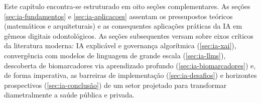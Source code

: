 Este capítulo encontra-se estruturado em oito seções complementares. As seções \ref{sec:ia-fundamentos} e \ref{sec:ia-aplicacoes} assentam os pressupostos teóricos (matemáticos e arquiteturais) e as consequentes aplicações práticas da IA em gêmeos digitais odontológicos. As seções subsequentes versam sobre eixos críticos da literatura moderna: IA explicável e governança algorítmica (\ref{sec:ia-xai}), convergência com modelos de linguagem de grande escala (\ref{sec:ia-llms}), descoberta de biomarcadores via aprendizado profundo (\ref{sec:ia-biomarcadores}) e, de forma imperativa, as barreiras de implementação (\ref{sec:ia-desafios}) e horizontes prospectivos (\ref{sec:ia-conclusão}) de um setor projetado para transformar diametralmente a saúde pública e privada.
